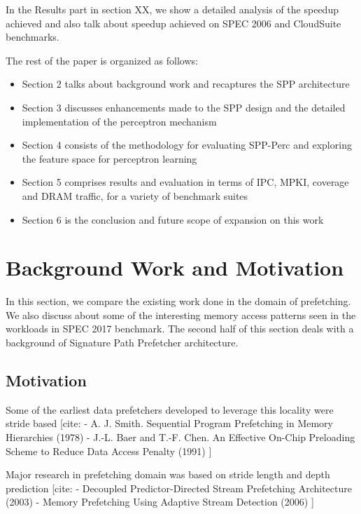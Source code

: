 \documentclass{sig-alternate}
\begin{document}
In the Results part in section XX, we show a detailed analysis of the speedup achieved and also talk about speedup achieved on SPEC 2006 and CloudSuite benchmarks.

\vspace{1ex}The rest of the paper is organized as follows:

\begin{itemize}
\item Section 2 talks about background work and recaptures the SPP architecture
\item Section 3 discusses enhancements made to the SPP design and the detailed implementation of the perceptron mechanism
\item Section 4 consists of the methodology for evaluating SPP-Perc and exploring the feature space for perceptron learning
\item Section 5 comprises results and evaluation in terms of IPC, MPKI, coverage and DRAM traffic, for a variety of benchmark suites
\item Section 6 is the conclusion and future scope of expansion on this work
\end{itemize}

\section{Background Work and Motivation}

In this section, we compare the existing work done in the domain of prefetching. 
We also discuss about some of the interesting memory access patterns seen in the workloads in SPEC 2017 benchmark. 
The second half of this section deals with a background of Signature Path Prefetcher architecture.

\subsection{Motivation}
Some of the earliest data prefetchers developed to leverage this locality were stride based [cite:\newline
- A. J. Smith. Sequential Program Prefetching in Memory Hierarchies (1978)\newline
- J.-L. Baer and T.-F. Chen. An Effective On-Chip Preloading Scheme to Reduce Data Access Penalty (1991)\newline
]\newline

Major research in prefetching domain was based on stride length and depth prediction [cite:\newline
- Decoupled Predictor-Directed Stream Prefetching
Architecture (2003)\newline
- Memory Prefetching Using Adaptive Stream Detection (2006)\newline
]\newline
\end{document}
